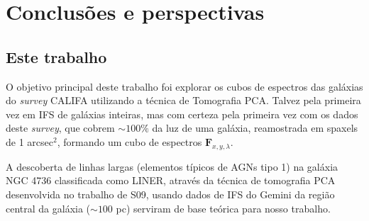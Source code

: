 


\chapter{Conclusões e perspectivas}
\label{sec:conclusao}


\section{Este trabalho}

O objetivo principal deste trabalho foi explorar os cubos de espectros das galáxias do {\em survey} CALIFA utilizando a
técnica de Tomografia PCA. Talvez pela primeira vez em IFS de galáxias inteiras, mas com certeza pela primeira vez com
os dados deste {\em survey}, que cobrem $\sim100\%$ da luz de uma galáxia, reamostrada em spaxels de 1 arcsec$^2$,
formando um cubo de espectros $\mathbf{F}_{x,y,\lambda}$.

A descoberta de linhas largas (elementos típicos de AGNs tipo 1) na galáxia NGC 4736 classificada como LINER, através
da técnica de tomografia PCA desenvolvida no trabalho de S09, usando dados de IFS do Gemini da região central da galáxia
($\sim100$ pc) serviram de base teórica para nosso trabalho.

